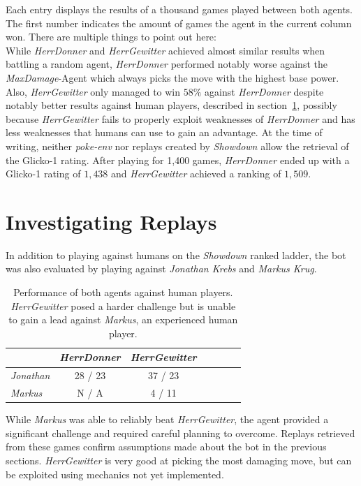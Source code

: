 Each entry displays the results of a thousand games played between both agents. The first number indicates the amount
of games the agent in the current column won. There are multiple things to point out here: \\
While \textit{HerrDonner} and \textit{HerrGewitter} achieved almost similar results when battling a random agent, 
\textit{HerrDonner} performed notably worse against the \textit{MaxDamage}-Agent which always picks the move with the
highest base power. Also, \textit{HerrGewitter} only managed to win $58\%$ against \textit{HerrDonner} despite notably
better results against human players, described in section~\ref{sec:investigate-replays}, possibly because 
\textit{HerrGewitter} fails to properly exploit weaknesses of \textit{HerrDonner} and has less weaknesses
that humans can use to gain an advantage. At the time of writing,
neither \textit{poke-env} nor replays created by \textit{Showdown} allow the retrieval of the Glicko-1 rating. After playing
for 1,400 games, \textit{HerrDonner} ended up with a Glicko-1 rating of $1,438$ and \textit{HerrGewitter} achieved
a ranking of $1,509$.

\section{Investigating Replays}
\label{sec:investigate-replays}
In addition to playing against humans on the \textit{Showdown} ranked ladder, the bot was also evaluated by playing
against \textit{Jonathan Krebs} and \textit{Markus Krug}. 
\begin{table}[h]
  \centering
  \begin{tabular}{|l|c|c|c|c|c|c|}
    \hline
    & \emph{HerrDonner} & \emph{HerrGewitter} \\
    \hline
    \emph{Jonathan} & 28 / 23 & 37 / 23 \\
    \hline
    \emph{Markus} & N / A & 4 / 11 \\
    \hline
    \end{tabular}
    \caption{Performance of both agents against human players. \textit{HerrGewitter} posed a 
    harder challenge but is unable to gain a lead against \textit{Markus}, an experienced
    human player.}
    \label{tab:agents-vs-humans}
\end{table}
While \textit{Markus} was able to reliably beat \textit{HerrGewitter}, the agent provided
a significant challenge and required careful planning to overcome. Replays retrieved
from these games confirm assumptions made about the bot in the previous sections. \textit{HerrGewitter}
is very good at picking the most damaging move, but can be exploited using mechanics not yet 
implemented. 


